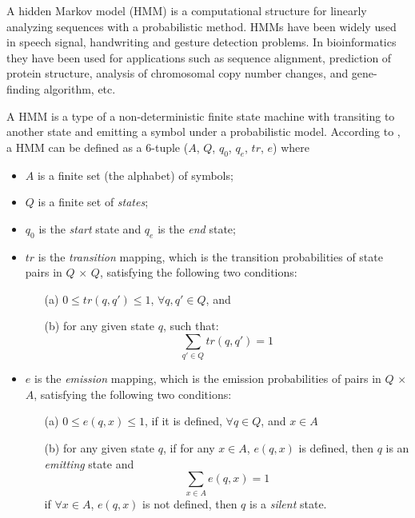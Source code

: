 A hidden Markov model (HMM) is a computational structure for linearly analyzing sequences with a probabilistic method\citep{DicBioinfo}. HMMs have been widely used in speech signal, handwriting and gesture detection problems. In bioinformatics they have been used for applications such as sequence alignment, prediction of protein structure, analysis of chromosomal copy number changes, and gene-finding algorithm, etc\citep{BioFunc}. 

A HMM is a type of a non-deterministic finite state machine with transiting to another state and emitting a symbol under a probabilistic model.
According to \citep{SeqData}, a HMM can be defined as a 6-tuple ($A$, $Q$, $q_0$, $q_e$, $tr$, $e$) where \\[-1cm]

\begin{itemize}
\item \textbf{$A$} is a finite set (the alphabet) of symbols;
\item \textbf{$Q$} is a finite set of \emph{states};
\item \textbf{$q_0$} is the \emph{start} state and \textbf{$q_e$} is the \emph{end} state;
\item \textbf{$tr$} is the \emph{transition} mapping, which is the transition probabilities of state pairs in $Q$ $\times$ $Q$, satisfying the following two conditions: 
  \begin{enumerate}
   \item[(a)] $0 \leqslant tr(q,q') \leqslant 1$, $\forall q,q' \in Q$, and
   \item[(b)] for any given state $q$, such that:
   \begin{equation*}
    \displaystyle\sum_{q' \in Q}tr(q,q') = 1
   \end{equation*}
  \end{enumerate}
\item \textbf{$e$} is the \emph{emission} mapping, which is the emission probabilities of pairs in $Q$ $\times$ $A$, satisfying the following two conditions:
  \begin{enumerate}
   \item[(a)] $0 \leqslant e(q,x) \leqslant 1$, if it is defined, $\forall q \in Q$, and $x \in A$
   \item[(b)] for any given state $q$, if for any $x \in A$, $e(q, x)$ is defined, then $q$ is an \emph{emitting} state and
   \begin{equation*}
    \displaystyle\sum_{x \in A}e(q,x) = 1 
   \end{equation*}
   if $\forall x \in A$, $e(q, x)$ is not defined, then $q$ is a \emph{silent} state.
  \end{enumerate}
\end{itemize}

